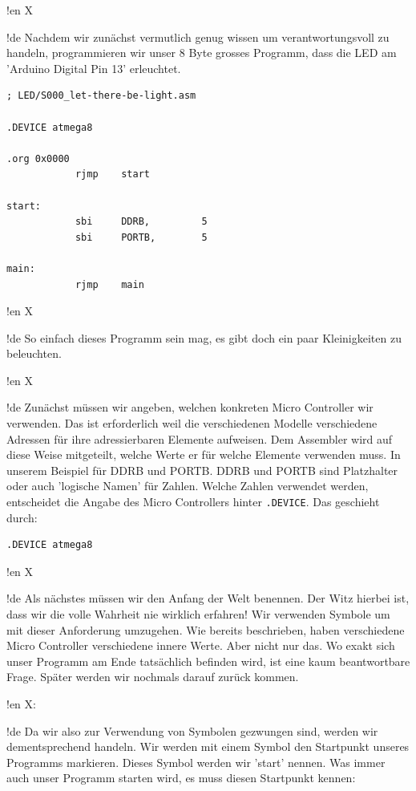 !en X

!de Nachdem wir zunächst vermutlich genug wissen um verantwortungsvoll zu handeln, programmieren wir unser 8 Byte grosses Programm, dass die LED am 'Arduino Digital Pin 13' erleuchtet.



\begin{lstlisting}
; LED/S000_let-there-be-light.asm

.DEVICE atmega8

.org 0x0000
            rjmp    start 

start:
            sbi     DDRB,         5
            sbi     PORTB,        5
            
main:
            rjmp    main
\end{lstlisting}


!en X

!de So einfach dieses Programm sein mag, es gibt doch ein paar Kleinigkeiten zu beleuchten.



!en X

!de Zunächst müssen wir angeben, welchen konkreten Micro Controller wir verwenden. Das ist erforderlich weil die verschiedenen Modelle verschiedene Adressen für ihre adressierbaren Elemente aufweisen. Dem Assembler wird auf diese Weise mitgeteilt, welche Werte er für welche Elemente verwenden muss. In unserem Beispiel für DDRB und PORTB. DDRB und PORTB sind Platzhalter oder auch 'logische Namen' für Zahlen. Welche Zahlen verwendet werden, entscheidet die Angabe des Micro Controllers hinter \texttt{.DEVICE}. Das geschieht durch:

\begin{lstlisting}
.DEVICE atmega8
\end{lstlisting}



!en X

!de Als nächstes müssen wir den Anfang der Welt benennen. Der Witz hierbei ist, dass wir die volle Wahrheit nie wirklich erfahren! Wir verwenden Symbole um mit dieser Anforderung umzugehen. Wie bereits beschrieben, haben verschiedene Micro Controller verschiedene innere Werte. Aber nicht nur das. Wo exakt sich unser Programm am Ende tatsächlich befinden wird, ist eine kaum beantwortbare Frage. Später werden wir nochmals darauf zurück kommen.


!en X:

!de Da wir also zur Verwendung von Symbolen gezwungen sind, werden wir dementsprechend handeln. Wir werden mit einem Symbol den Startpunkt unseres Programms markieren. Dieses Symbol werden wir 'start' nennen. Was immer auch unser Programm starten wird, es muss diesen Startpunkt kennen:

